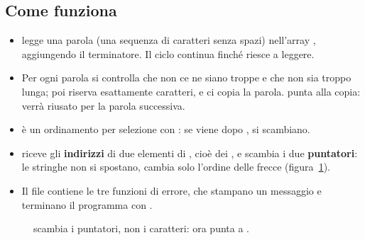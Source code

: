 \subsection{Come funziona}

\begin{itemize}
  \item {} legge una parola (una sequenza di
        caratteri senza spazi) nell'array , aggiungendo il
        terminatore. Il ciclo continua finché  riesce a leggere.
  \item Per ogni parola si controlla che non ce ne siano troppe e che non
        sia troppo lunga; poi  riserva esattamente
         caratteri, e  ci copia la
        parola.  punta alla copia:  verrà riusato per
        la parola successiva.
  \item {} è un ordinamento per selezione con :
        se  viene dopo , si scambiano.
  \item {} riceve gli \textbf{indirizzi} di due elementi di
        , cioè dei , e scambia i due
        \textbf{puntatori}: le stringhe non si spostano, cambia solo
        l'ordine delle frecce (figura~\ref{fig:scambio-puntatori}).
  \item Il file  contiene le tre funzioni di errore, che
        stampano un messaggio e terminano il programma con .
\end{itemize}

\begin{figure}[H]
  \centering
  \caption{ scambia i puntatori, non i caratteri: ora
            punta a .}
  \label{fig:scambio-puntatori}
\end{figure}

